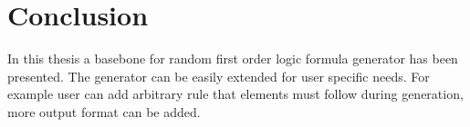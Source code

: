 \chapter{Conclusion}

In this thesis a basebone for random first order logic formula generator has been presented. The generator can be easily extended for user specific needs. For example user can add arbitrary rule that elements must follow during generation, more output format can be added.
